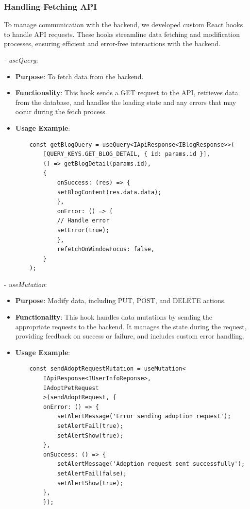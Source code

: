 \subsubsection*{Handling Fetching API}

To manage communication with the backend, we developed custom React hooks to handle API requests. These hooks streamline data fetching and modification processes, ensuring efficient and error-free interactions with the backend.

- \textit{useQuery}:

\begin{itemize}
    \item \textbf{Purpose}: To fetch data from the backend.
    \item \textbf{Functionality}: This hook sends a GET request to the API, retrieves data from the database, and handles the loading state and any errors that may occur during the fetch process.
    \item \textbf{Usage Example}:
          \begin{lstlisting}
    const getBlogQuery = useQuery<IApiResponse<IBlogResponse>>(
        [QUERY_KEYS.GET_BLOG_DETAIL, { id: params.id }],
        () => getBlogDetail(params.id),
        {
            onSuccess: (res) => {
            setBlogContent(res.data.data);
            },
            onError: () => {
            // Handle error
            setError(true);
            },
            refetchOnWindowFocus: false,
        }
    );
            \end{lstlisting}
\end{itemize}

- \textit{useMutation}:

\begin{itemize}
    \item \textbf{Purpose}: Modify data, including PUT, POST, and DELETE actions.
    \item \textbf{Functionality}: This hook handles data mutations by sending the appropriate requests to the backend. It manages the state during the request, providing feedback on success or failure, and includes custom error handling.
    \item \textbf{Usage Example}:
          \begin{lstlisting}
    const sendAdoptRequestMutation = useMutation<
        IApiResponse<IUserInfoReponse>,
        IAdoptPetRequest
        >(sendAdoptRequest, {
        onError: () => {
            setAlertMessage('Error sending adoption request');
            setAlertFail(true);
            setAlertShow(true);
        },
        onSuccess: () => {
            setAlertMessage('Adoption request sent successfully');
            setAlertFail(false);
            setAlertShow(true);
        },
        });
            \end{lstlisting}
\end{itemize}

